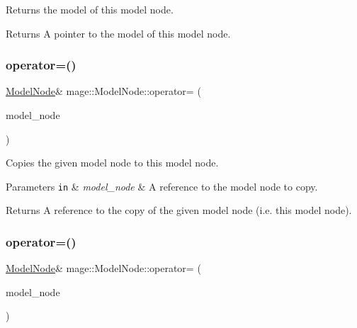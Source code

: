 Returns the model of this model node.

\begin{DoxyReturn}{Returns}
A pointer to the model of this model node. 
\end{DoxyReturn}
\hypertarget{classmage_1_1_model_node_ad8378279b79930dfe98d176dbc1c5db9}{}\label{classmage_1_1_model_node_ad8378279b79930dfe98d176dbc1c5db9} 
\subsubsection{\texorpdfstring{operator=()}{operator=()}\hspace{0.1cm}{\footnotesize\ttfamily [1/2]}}
{\footnotesize\ttfamily \hyperlink{classmage_1_1_model_node}{Model\+Node}\& mage\+::\+Model\+Node\+::operator= (\begin{DoxyParamCaption}\item[{const \hyperlink{classmage_1_1_model_node}{Model\+Node} \&}]{model\+\_\+node }\end{DoxyParamCaption})\hspace{0.3cm}{\ttfamily [delete]}}

Copies the given model node to this model node.


\begin{DoxyParams}[1]{Parameters}
\mbox{\tt in}  & {\em model\+\_\+node} & A reference to the model node to copy. \\
\hline
\end{DoxyParams}
\begin{DoxyReturn}{Returns}
A reference to the copy of the given model node (i.\+e. this model node). 
\end{DoxyReturn}
\hypertarget{classmage_1_1_model_node_ad39321f4d392aa4e28169b8d7a08af68}{}\label{classmage_1_1_model_node_ad39321f4d392aa4e28169b8d7a08af68} 
\subsubsection{\texorpdfstring{operator=()}{operator=()}\hspace{0.1cm}{\footnotesize\ttfamily [2/2]}}
{\footnotesize\ttfamily \hyperlink{classmage_1_1_model_node}{Model\+Node}\& mage\+::\+Model\+Node\+::operator= (\begin{DoxyParamCaption}\item[{\hyperlink{classmage_1_1_model_node}{Model\+Node} \&\&}]{model\+\_\+node }\end{DoxyParamCaption})\hspace{0.3cm}{\ttfamily [delete]}}

